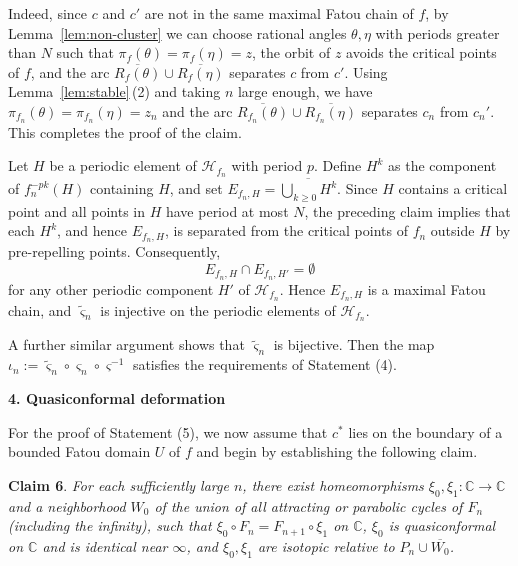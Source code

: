 \documentclass[a4paper,reqno,times, 11pt]{amsart}
\theoremstyle{remark}
\theoremstyle{plain}
\numberwithin{equation}{section}
\def\C{\mbox{$\mathbb C$}}
\begin{document}
		Indeed, since \(c\) and \(c'\) are not in the same maximal Fatou chain of \(f\), by Lemma~\ref{lem:non-cluster} we can choose rational angles \(\theta,\eta\) with periods greater than \(N\) such that \(\pi_f(\theta)=\pi_f(\eta)=z\), the orbit of \(z\) avoids the critical points of \(f\), and the arc \(\overline{R_f(\theta)}\cup\overline{R_f(\eta)}\) separates \(c\) from \(c'\). Using Lemma~\ref{lem:stable}\,(2) and taking \(n\) large enough, we have \(\pi_{f_n}(\theta)=\pi_{f_n}(\eta)=z_n\) and the arc \(\overline{R_{f_n}(\theta)}\cup\overline{R_{f_n}(\eta)}\) separates \(c_n\) from \(c_n'\). This completes the proof of the claim.
		
		
		
		Let $H$ be a periodic element of $\mathcal{H}_{f_n}$ with period $p$. Define $H^k$ as the component of $f_n^{-pk}(H)$ containing $H$, and set $E_{f_n,H} = \overline{\bigcup_{k\geq 0} H^k}$. Since $H$ contains a critical point and all points in $H$ have period at most $N$, the preceding claim implies that each $H^k$, and hence $E_{f_n,H}$, is separated from the critical points of $f_n$ outside $H$ by pre-repelling points.
		Consequently, $$E_{f_n,H}\cap E_{f_n,H'}=\emptyset$$ for any other periodic component \(H'\) of \(\mathcal{H}_{f_n}\). Hence \(E_{f_n,H}\) is a maximal Fatou chain, and \(\widetilde{\varsigma}_n\) is injective on the periodic elements of \(\mathcal{H}_{f_n}\).
		
		A further similar argument shows that $\widetilde{\varsigma}_n$ is bijective. Then the map $\iota_n := \widetilde{\varsigma}_n \circ \varsigma_n \circ \varsigma^{-1}$ satisfies the requirements of Statement (4).
		
		
		\vspace{5pt}
		
		{\bf 4. Quasiconformal deformation}\vspace{5pt}
		
		For the proof of Statement (5), we now assume that $c^*$ lies on the boundary of a bounded Fatou domain $U$ of $f$ and begin by establishing the following claim.\vspace{5pt}
		
		{\bf Claim 6}. \emph{For each sufficiently large  $n$, there exist homeomorphisms $\xi_0,\xi_1:\C\to\C$ and a neighborhood $W_0$ of the union of all attracting or parabolic cycles  of $F_n$ (including the infinity), such that
			$\xi_0\circ F_n=F_{n+1}\circ \xi_1$ on $\C$, $\xi_0$ is quasiconformal on $\C$ and is identical near $\infty$,  and $\xi_0,\xi_1$ are isotopic relative to $P_{n}\cup \overline{W_0}$.}
		
\end{document}
